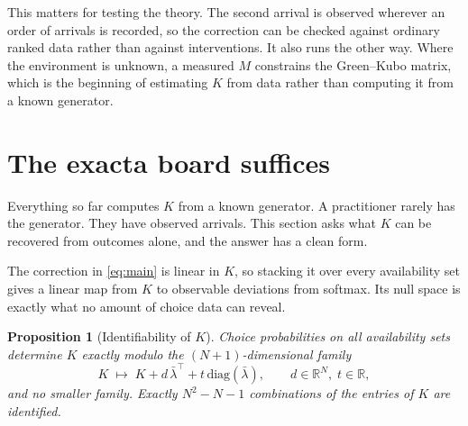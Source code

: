\documentclass[11pt]{article}
\newtheorem{proposition}{Proposition}
\theoremstyle{remark}
\newcommand{\R}{\mathbb{R}}
\newcommand{\lbar}{\bar{\lambda}}
\begin{document}
This matters for testing the theory. The second arrival is observed wherever an order of arrivals is
recorded, so the correction can be checked against ordinary
ranked data rather than against interventions. It also runs the other way. Where
the environment is unknown, a measured $M$ constrains the Green--Kubo matrix,
which is the beginning of estimating $K$ from data rather than computing it from
a known generator.

\section{The exacta board suffices}\label{sec:identify}

Everything so far computes $K$ from a known generator. A practitioner rarely
has the generator. They have observed arrivals. This section asks what $K$ can be recovered
from outcomes alone, and the answer has a clean form.

The correction in \eqref{eq:main} is linear in $K$, so stacking it over every
availability set gives a linear map from $K$ to observable deviations from
softmax. Its null space is exactly what no amount of choice data can reveal.

\begin{proposition}[Identifiability of $K$]\label{prop:identify}
Choice probabilities on all availability sets determine $K$ exactly modulo the
$(N{+}1)$-dimensional family
\begin{equation}\label{eq:nullfamily}
  K \;\longmapsto\; K + d\,\lbar^\top + t\,\mathrm{diag}(\lbar),
  \qquad d \in \R^N,\; t \in \R,
\end{equation}
and no smaller family. Exactly $N^2 - N - 1$ combinations of the entries of $K$
are identified.
\end{proposition}
\end{document}
